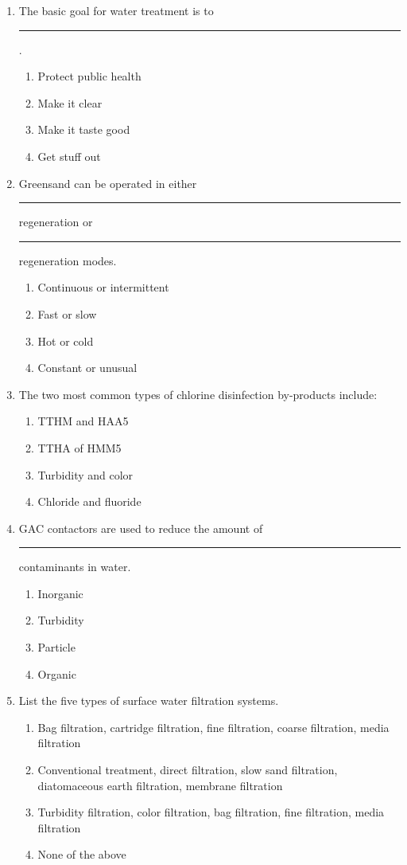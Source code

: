 \begin{enumerate}
\item The basic goal for water treatment is to \rule{2cm}{0.3pt}.
\begin{enumerate}
\item Protect public health
\item Make it clear
\item Make it taste good
\item Get stuff out
\end{enumerate}

\item Greensand can be operated in either \rule{2cm}{0.5pt} regeneration or \rule{2cm}{0.5pt} regeneration modes.
\begin{enumerate}
\item Continuous or intermittent
\item Fast or slow
\item Hot or cold
\item Constant or unusual
\end{enumerate}

\item The two most common types of chlorine disinfection by-products include:
\begin{enumerate}
\item TTHM and HAA5
\item TTHA of HMM5
\item Turbidity and color
\item Chloride and fluoride
\end{enumerate}

\item GAC contactors are used to reduce the amount of \rule{2cm}{0.5pt} contaminants in water.
\begin{enumerate}
\item Inorganic
\item Turbidity
\item Particle
\item Organic
\end{enumerate}

\item List the five types of surface water filtration systems.
\begin{enumerate}
\item Bag filtration, cartridge filtration, fine filtration, coarse filtration, media filtration
\item Conventional treatment, direct filtration, slow sand filtration, diatomaceous earth filtration, membrane filtration
\item Turbidity filtration, color filtration, bag filtration, fine filtration, media filtration
\item None of the above
\end{enumerate}


\end{enumerate}
